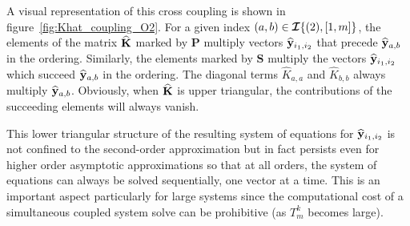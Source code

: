 A visual representation of this cross coupling is shown in figure~\ref{fig:Khat_coupling_O2}. For a given index $(a,b)\in\bm{\mathcal{I}}\{(2),[1,m]\}$, the elements of the matrix $\mathbf{\widehat{K}}$ marked by $\mathbf{P}$ multiply vectors $\widehat{\mathbf{y}}_{i_{1},i_{2}}$ that precede $\widehat{\mathbf{y}}_{a,b}$ in the ordering. Similarly, the elements marked by $\mathbf{S}$ multiply the vectors $\widehat{\mathbf{y}}_{i_{1},i_{2}}$ which succeed $\widehat{\mathbf{y}}_{a,b}$ in the ordering. The diagonal terms $\widehat{K}_{a,a}$ and $\widehat{K}_{b,b}$ always multiply $\widehat{\mathbf{y}}_{a,b}$. Obviously, when $\mathbf{\widehat{K}}$ is upper triangular, the contributions of the succeeding elements will always vanish. 

This lower triangular structure of the resulting system of equations for $\widehat{\mathbf{y}}_{i_{1},i_{2}}$ is not confined to the second-order approximation but in fact persists even for higher order asymptotic approximations so that at all orders, the system of equations can always be solved sequentially, one vector at a time. This is an important aspect particularly for large systems since the computational cost of a simultaneous coupled system solve can be prohibitive (as $T^{k}_{m}$ becomes large).

